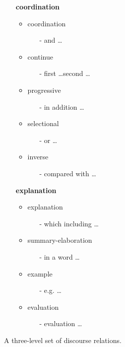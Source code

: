\begin{figure}[ht]
\begin{multicols}{2}
\begin{itemize}
  \vfill
  \columnbreak

  \item[] \textbf{coordination}
  \begin{itemize}
    \item coordination
    \begin{itemize}
      \item[-] and \ldots
    \end{itemize}
    \item continue
    \begin{itemize}
      \item[-] first \ldots second \ldots
    \end{itemize}
    \item progressive
    \begin{itemize}
      \item[-] in addition \ldots
    \end{itemize}
    \item selectional
    \begin{itemize}
      \item[-] or \ldots
    \end{itemize}
    \item inverse
    \begin{itemize}
      \item[-] compared with \ldots
    \end{itemize}
  \end{itemize}

  \item[] \textbf{explanation}
  \begin{itemize}
    \item explanation
    \begin{itemize}
      \item[-] which including \ldots
    \end{itemize}
    \item summary-elaboration
    \begin{itemize}
      \item[-] in a word \ldots
    \end{itemize}
    \item example
    \begin{itemize}
      \item[-] e.g. \ldots
    \end{itemize}
    \item evaluation
    \begin{itemize}
      \item[-] evaluation \ldots
    \end{itemize}
  \end{itemize}
\end{itemize}
\end{multicols}

\caption{\label{i:three-level} A three-level set of discourse relations. }
\end{figure}
